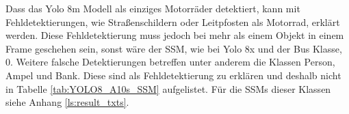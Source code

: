 {\begin{table}[ht]
\begin{tabular}{l|l|l|l|l|l|l}
			\end{tabular}
		\end{table}
		Dass das Yolo 8m Modell als einziges Motorräder detektiert, kann mit Fehldetektierungen, wie Straßenschildern oder Leitpfosten als Motorrad, erklärt werden. Diese Fehldetektierung muss jedoch bei mehr als einem Objekt in einem Frame geschehen sein, sonst wäre der SSM, wie bei Yolo 8x und der Bus Klasse, 0.
		Weitere falsche Detektierungen betreffen unter anderem die Klassen Person, Ampel und Bank. Diese sind als Fehldetektierung zu erklären und deshalb nicht in Tabelle \ref{tab:YOLO8_A10s_SSM} aufgelistet. Für die SSMs dieser Klassen siehe Anhang \ref{ls:result_txts}.
	}
	

	





